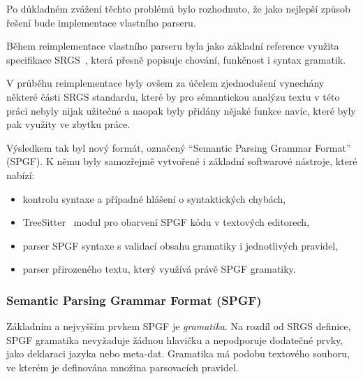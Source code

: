 Po důkladném zvážení těchto problémů bylo rozhodnuto,
že jako nejlepší způsob řešení bude implementace vlastního parseru.

Během reimplementace vlastního parseru byla jako základní reference využita specifikace SRGS~\cite{srgs},
která přesně popisuje chování, funkčnost i syntax gramatik.

V průběhu reimplementace byly ovšem za účelem zjednodušení vynechány některé části SRGS standardu,
které by pro sémantickou analýzu textu v této práci nebyly nijak užitečné a naopak byly přidány nějaké funkce navíc,
které byly pak využity ve zbytku práce.

Výsledkem tak byl nový formát, označený \enquote{Semantic Parsing Grammar Format} (SPGF).
K němu byly samozřejmě vytvořené i základní softwarové nástroje, které nabízí:
\begin{itemize}
	\item kontrolu syntaxe a případné hlášení o syntaktických chybách,
	\item TreeSitter~\cite{treesitter} modul pro obarvení SPGF kódu v textových editorech,
	\item parser SPGF syntaxe s validací obsahu gramatiky i jednotlivých pravidel,
	\item parser přirozeného textu, který využívá právě SPGF gramatiky.
\end{itemize}

\subsubsection{Semantic Parsing Grammar Format (SPGF)}\label{subsubsec:spgf_def}
Základním a nejvyšším prvkem SPGF je \emph{gramatika}.
Na rozdíl od SRGS definice, SPGF gramatika nevyžaduje žádnou hlavičku a nepodporuje dodatečné prvky,
jako deklaraci jazyka nebo meta-dat.
Gramatika má podobu textového souboru, ve kterém je definována množina parsovacích pravidel.

